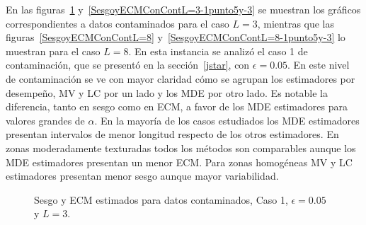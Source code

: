 En las figuras~\ref{SesgoyECMConContL=3} y~\ref{SesgoyECMConContL=3-1punto5y-3} se muestran los gráficos correspondientes a datos contaminados para el caso $L=3$, mientras que las figuras~\ref{SesgoyECMConContL=8} y~\ref{SesgoyECMConContL=8-1punto5y-3} lo muestran para el caso $L=8$. En esta instancia se analizó el caso 1 de contaminación, que se presentó en la sección~\ref{jstar}, con $\epsilon=0.05$. En este nivel de contaminación se ve con mayor claridad cómo se agrupan los estimadores por desempeño, MV y LC por un lado y los MDE por otro lado. Es notable la diferencia, tanto en sesgo como en ECM, a favor de los MDE estimadores para valores grandes de $\alpha$. En la mayoría de los casos estudiados los MDE estimadores presentan intervalos de menor longitud respecto de los otros estimadores. En zonas moderadamente texturadas todos los métodos son comparables aunque los MDE estimadores presentan un menor ECM. Para zonas homogéneas MV y LC estimadores presentan menor sesgo aunque mayor variabilidad.

\begin{figure}[H]
	\caption{\label{SesgoyECMConContL=3}\small Sesgo y ECM estimados para datos contaminados, Caso 1, $\epsilon=0.05$ y $ L=3$.}
\end{figure}

